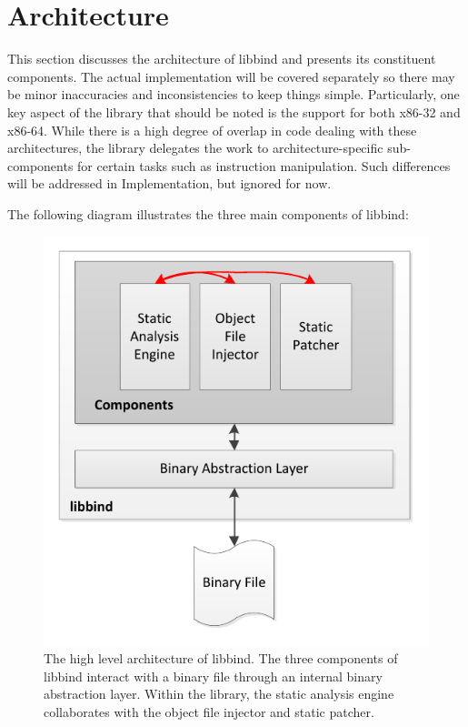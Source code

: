 \chapter{Architecture}\label{chap:Architecture}

This section discusses the architecture of libbind  and presents its constituent components. The actual implementation will be covered separately so there may be minor inaccuracies and inconsistencies to keep things simple. Particularly, one key aspect of the library that should be noted is the support for both x86-32 and x86-64. While there is a high degree of overlap in code dealing with these architectures, the library delegates the work to architecture-specific sub-components for certain tasks such as instruction manipulation. Such differences will be addressed in Implementation, but ignored for now.

The following diagram illustrates the three main components of libbind:

\begin{figure}[H]
 \centering
 \includegraphics{Architecture.pdf}
 \caption[Architecture]{The high level architecture of libbind. The three components of libbind interact with a binary file through an internal binary abstraction layer. Within the library, the static analysis engine collaborates with the object file injector and static patcher.}
\end{figure}

